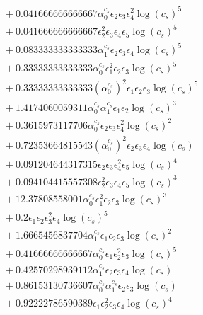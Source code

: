 \documentclass[10pt]{article}
\begin{document}
\begin{align*}
&{}  + 0.041666666666667 \alpha_{0}^{c_s} \epsilon_{2} \epsilon_{3} \epsilon_{4}^{2} \log{\left(c_{s} \right)}^{5} \\
&{}  + 0.041666666666667 \epsilon_{2}^{2} \epsilon_{3} \epsilon_{4} \epsilon_{5} \log{\left(c_{s} \right)}^{5} \\
&{}  + 0.083333333333333 \alpha_{1}^{c_s} \epsilon_{2} \epsilon_{3} \epsilon_{4} \log{\left(c_{s} \right)}^{5} \\
&{}  + 0.33333333333333 \alpha_{0}^{c_s} \epsilon_{1}^{2} \epsilon_{2} \epsilon_{3} \log{\left(c_{s} \right)}^{5} \\
&{}  + 0.33333333333333 \left(\alpha_{0}^{c_s}\right)^{2} \epsilon_{1} \epsilon_{2} \epsilon_{3} \log{\left(c_{s} \right)}^{5} \\
&{}  + 1.4174060059311 \alpha_{0}^{c_s} \alpha_{1}^{c_s} \epsilon_{1} \epsilon_{2} \log{\left(c_{s} \right)}^{3} \\
&{}  + 0.3615973117706 \alpha_{0}^{c_s} \epsilon_{2} \epsilon_{3} \epsilon_{4}^{2} \log{\left(c_{s} \right)}^{2} \\
&{}  + 0.72353664815543 \left(\alpha_{0}^{c_s}\right)^{2} \epsilon_{2} \epsilon_{3} \epsilon_{4} \log{\left(c_{s} \right)} \\
&{}  + 0.091204644317315 \epsilon_{2} \epsilon_{3} \epsilon_{4}^{2} \epsilon_{5} \log{\left(c_{s} \right)}^{4} \\
&{}  + 0.094104415557308 \epsilon_{2}^{2} \epsilon_{3} \epsilon_{4} \epsilon_{5} \log{\left(c_{s} \right)}^{3} \\
&{}  + 12.37808558001 \alpha_{0}^{c_s} \epsilon_{1}^{2} \epsilon_{2} \epsilon_{3} \log{\left(c_{s} \right)}^{3} \\
&{}  + 0.2 \epsilon_{1} \epsilon_{2} \epsilon_{3}^{2} \epsilon_{4} \log{\left(c_{s} \right)}^{5} \\
&{}  + 1.6665456837704 \alpha_{1}^{c_s} \epsilon_{1} \epsilon_{2} \epsilon_{3} \log{\left(c_{s} \right)}^{2} \\
&{}  + 0.41666666666667 \alpha_{0}^{c_s} \epsilon_{1} \epsilon_{2}^{2} \epsilon_{3} \log{\left(c_{s} \right)}^{5} \\
&{}  + 0.42570298939112 \alpha_{1}^{c_s} \epsilon_{2} \epsilon_{3} \epsilon_{4} \log{\left(c_{s} \right)} \\
&{}  + 0.86153130736607 \alpha_{0}^{c_s} \alpha_{1}^{c_s} \epsilon_{2} \epsilon_{3} \log{\left(c_{s} \right)} \\
&{}  + 0.92222786590389 \epsilon_{1} \epsilon_{2}^{2} \epsilon_{3} \epsilon_{4} \log{\left(c_{s} \right)}^{4} \\

\end{align*}
\end{document}
